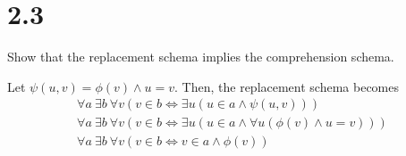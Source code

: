 \documentclass[10pt]{mypackage}
\begin{document}
\section{2.3}%
\begin{problem}
  Show that the replacement schema implies the comprehension schema.
\end{problem}
\begin{solution}
  Let $\psi(u,v) = \phi(v) \wedge u = v$. Then, the replacement schema becomes
  \begin{align*}
    \forall a\: \exists b\:\forall v\left(v\in b \Leftrightarrow \exists u\left(u\in a \wedge \psi(u,v)\right)\right)\\
    \forall a\: \exists b \:\forall v \left(v\in b \Leftrightarrow \exists u \left(u\in a \wedge \forall u\left(\phi(v) \wedge u = v\right)\right)\right)\\
    \forall a\:\exists b \: \forall v \left(v\in b \Leftrightarrow v\in a \wedge \phi(v)\right)
  \end{align*}
\end{solution}
\end{document}
